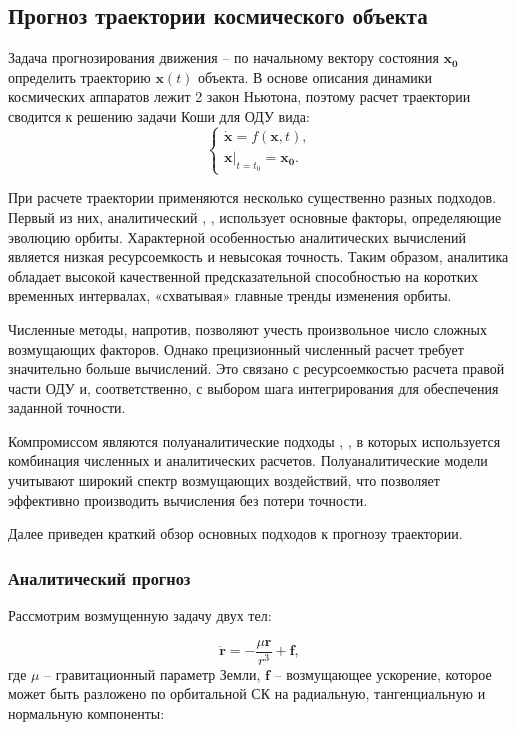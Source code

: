 \subsection{Прогноз траектории космического объекта}
Задача прогнозирования движения -- по начальному вектору состояния $\mathbf{x_0}$ определить траекторию $\mathbf{x}(t)$ объекта.
В основе описания динамики космических аппаратов лежит 2 закон Ньютона, 
поэтому расчет траектории сводится к решению задачи Коши для ОДУ вида:
\begin{equation}
    \begin{cases}
        \dot{\mathbf{x}} = f(\mathbf{x}, t), \\
        \mathbf{x} \big|_{t = t_0} = \mathbf{x_0}.
        \label{eq:prognoz_task}
    \end{cases}
\end{equation}

При расчете траектории применяются несколько существенно разных подходов. 
Первый из них, аналитический \cite{vallado2008}, \cite{Nazarenko1981}, использует основные факторы, определяющие эволюцию орбиты.
Характерной особенностью аналитических вычислений является низкая ресурсоемкость и невысокая точность.
Таким образом, аналитика обладает высокой качественной предсказательной способностью на коротких временных интервалах, 
«схватывая» главные тренды изменения орбиты.

Численные методы, напротив, позволяют учесть произвольное число сложных возмущающих факторов.
Однако прецизионный численный расчет требует значительно больше вычислений. 
Это связано с ресурсоемкостью расчета правой части ОДУ и,
соответственно, с выбором шага интегрирования для обеспечения заданной точности.

Компромиссом являются полуаналитические подходы \cite{tulin2018}, \cite{Nazarenko1981}, 
в которых используется комбинация численных и аналитических расчетов.
Полуаналитические модели учитывают широкий спектр возмущающих воздействий, 
что позволяет эффективно производить вычисления без потери точности.

Далее приведен краткий обзор основных подходов к прогнозу траектории.

\subsubsection{Аналитический прогноз}
Рассмотрим возмущенную задачу двух тел:

\begin{equation}
    \ddot{\mathbf{r}} = - \frac{\mu \mathbf{r}}{r^3} + \mathbf{f},
    \label{eq:analyt_rv}
\end{equation}
где $\mu$ -- гравитационный параметр Земли, $\mathbf{f}$ -- возмущающее ускорение, которое может быть разложено по орбитальной СК на радиальную, тангенциальную и нормальную компоненты:

